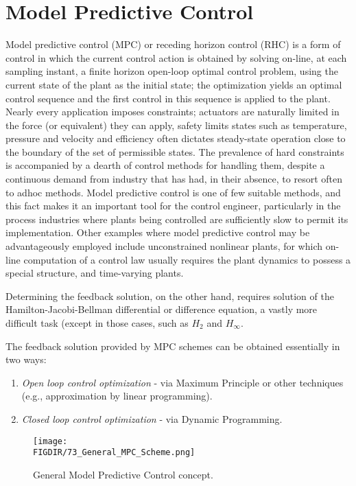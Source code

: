\section{Model Predictive Control}
\noindent Model predictive control (MPC) or receding horizon control (RHC) is a form of control in which the current control action is obtained by solving on-line, at each sampling instant, a finite horizon open-loop optimal control problem, using the current state of the plant as the initial state; the optimization yields an optimal control sequence and the first control in this sequence is applied to the plant. Nearly every application imposes constraints; actuators are naturally limited in the force (or equivalent) they can apply, safety limits states such as temperature, pressure and velocity and efficiency often dictates steady-state operation close to the boundary of the set of permissible states. The prevalence of hard constraints is accompanied by a dearth of control methods for handling them, despite a continuous demand from industry that has had, in their absence, to resort often to adhoc methods. Model predictive control is one of few suitable methods, and this fact makes it an important tool for the control engineer, particularly in the process industries where plants being controlled are sufficiently slow to permit its implementation. Other examples where model predictive control may be advantageously employed include unconstrained nonlinear plants, for which on-line computation of a control law usually requires the plant dynamics to possess a special structure, and time-varying plants. 

Determining the feedback solution, on the other hand, requires solution of the Hamilton-Jacobi-Bellman differential or difference equation, a vastly more difficult task (except in those cases, such as $H_2$ and $H_\infty$.

The feedback solution provided by MPC schemes can be obtained essentially in two ways:
\begin{enumerate}
    \item \textit{Open loop control optimization} - via Maximum Principle or other techniques (e.g., approximation by linear programming).
    \item \textit{Closed loop control optimization} - via Dynamic Programming.
\end{enumerate}

\begin{figure}[H]
    \centering
    \texttt{[image: \\FIGDIR/73\_General\_MPC\_Scheme.png]}
    \caption{General Model Predictive Control concept.}
    \label{fig:generalMPCConcept}
\end{figure}

